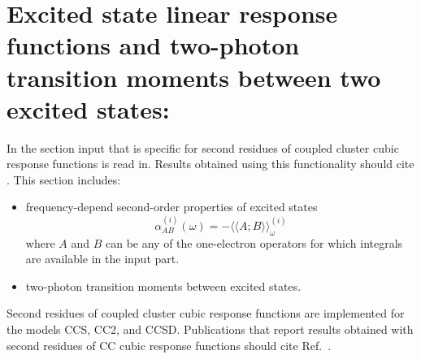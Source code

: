 
\section{Excited state linear response functions and
         two-photon transition moments between two excited states:
         }
\label{sec:ccexlr}

In the  section input that is specific for 
second residues of coupled cluster cubic response functions 
is read in.
Results obtained using this functionality should cite
\cite{Haettig:EXCITED,Haettig:EXLR}. 
This section includes:
\begin{itemize}
\item frequency-depend second-order properties of excited states
      $$ \alpha^{(i)}_{AB}(\omega) = 
         -\langle\langle A; B\rangle\rangle^{(i)}_\omega $$
      where $A$ and $B$ can be any of the one-electron operators
      for which integrals  are available in the 
      input part.
\item two-photon transition moments between excited states.
\end{itemize}
Second residues of coupled cluster cubic response functions are
implemented for the models CCS, CC2, and CCSD.
Publications that report results obtained with second residues
of CC cubic response functions should cite Ref.\ \cite{Haettig:EXLR}.

